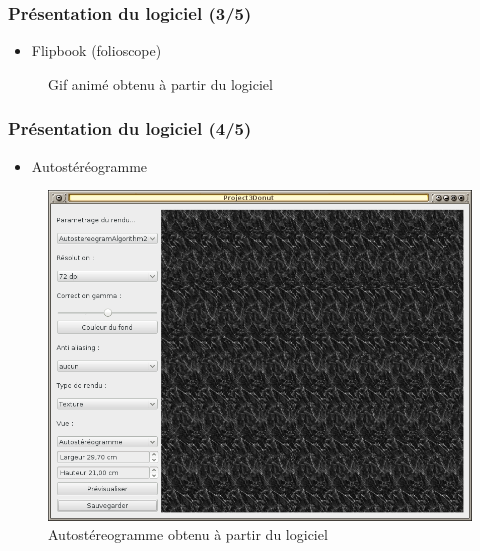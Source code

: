 \documentclass{beamer}
\begin{document}
%
\begin{frame}
\frametitle{Présentation du logiciel (3/5)}
\begin{itemize}[label=$\bullet$]
\item Flipbook (folioscope)
\end{itemize}
\begin{figure}
\centering
{}
\caption{Gif animé obtenu à partir du logiciel}
\end{figure}
\end{frame}



%
\begin{frame}
\frametitle{Présentation du logiciel (4/5)}
\begin{itemize}[label=$\bullet$]
\item Autostéréogramme
\end{itemize}
\begin{figure}
\centering
\includegraphics[scale=0.28]{renduautostereogrammes.png}
\caption{Autostéreogramme obtenu à partir du logiciel}
\end{figure}
\end{frame}
\end{document}
